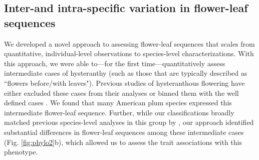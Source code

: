\documentclass{article}[12pt]
\begin{document}
{{\subsection*{Inter-and intra-specific variation in flower-leaf sequences} %
We developed a novel approach to assessing flower-leaf sequences that scales from quantitative, individual-level observations to species-level characterizations. With this approach, we were able to---for the first time---quantitatively assess intermediate cases of hysteranthy (such as those that are typically described as ``flowers before/with leaves"). Previous studies of hysteranthous flowering have either excluded these cases from their analyses  \citep[e.g.;][]{Gougherty2018} or binned them with the well defined cases \citep[e.g.;][]{Buonaiuto2020}. We found that many American plum species expressed this intermediate flower-leaf sequence. Further, while our classifications broadly matched previous species-level analyses in this group by \citet{Shaw:2004aa}, our approach identified substantial differences in flower-leaf sequences among these intermediate cases (Fig. \ref{fig:phylo2}b), which allowed us to assess the trait associations with this phenotype.
% 

}}
\end{document}
